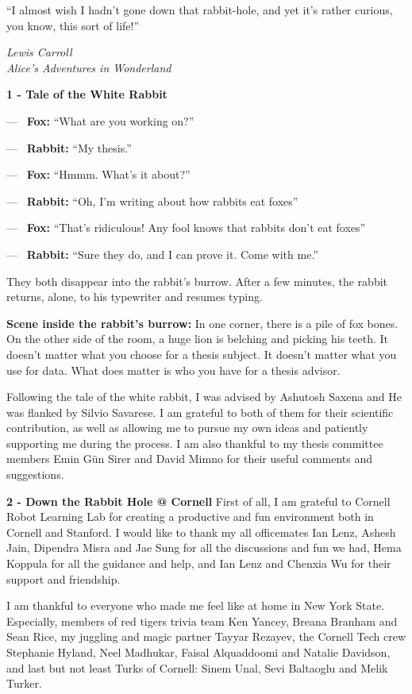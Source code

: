 \epigraph{``I almost wish I hadn't gone down that rabbit-hole, and yet it's rather curious, you know, this sort of life!''}{\textit{Lewis Carroll\\ Alice's Adventures in Wonderland}}

\noindent \textbf{1 - Tale of the White Rabbit \cite{tale}}

\noindent ---~ \textbf{Fox:} ``What are you working on?''

\noindent ---~ \textbf{Rabbit:} ``My thesis.''

\noindent ---~ \textbf{Fox:} ``Hmmm. What's it about?''

\noindent ---~ \textbf{Rabbit:} ``Oh, I'm writing about how rabbits eat foxes''

\noindent ---~ \textbf{Fox:} ``That's ridiculous! Any fool knows that rabbits don't eat foxes''

\noindent ---~ \textbf{Rabbit:} ``Sure they do, and I can prove it. Come with me.''

They both disappear into the rabbit's burrow. After a few minutes, the rabbit returns, alone, to his typewriter and resumes typing.

\textbf{Scene inside the rabbit's burrow:} In one corner, there is a pile of fox bones. On the other side of the room, a huge lion is belching and picking his teeth. It doesn't matter what you choose for a thesis subject. It doesn't matter what you use for data. What does matter is who you have for a thesis advisor.

Following the tale of the white rabbit, I was advised by Ashutosh Saxena and He was flanked by Silvio Savarese. I am grateful to both of them for their scientific contribution, as well as allowing me to pursue my own ideas and patiently supporting me during the process. I am also thankful to my thesis committee members Emin G\"{u}n Sirer and David Mimno for their useful comments and suggestions. 

\noindent \textbf{2 - Down the Rabbit Hole @ Cornell}
First of all, I am grateful to Cornell Robot Learning Lab for creating a productive and fun environment both in Cornell and Stanford. I would like to thank my all officemates Ian Lenz, Ashesh Jain, Dipendra Misra and Jae Sung for all the discussions and fun we had, Hema Koppula for all the guidance and help, and Ian Lenz and Chenxia Wu for their support and friendship.

I am thankful to everyone who made me feel like at home in New York State. Especially, members of red tigers trivia team Ken Yancey, Breana Branham and Sean Rice, my juggling and magic partner Tayyar Rezayev, the Cornell Tech crew Stephanie Hyland, Neel Madhukar, Faisal Alquaddoomi and Natalie Davidson, and last but not least Turks of Cornell: Sinem Unal, Sevi Baltaoglu and Melik Turker.

